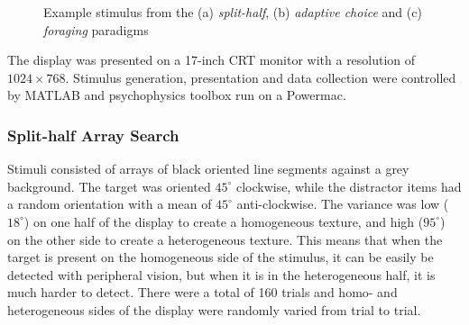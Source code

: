 \documentclass[]{rsos}%
\begin{document}
\begin{figure}
\centering
{}
\caption{Example stimulus from the (a) \textit{split-half}, (b) \textit{adaptive choice} and (c) \textit{foraging} paradigms}
\label{fig:exampleStimuli}
\end{figure}

The display was presented on a 17-inch CRT monitor with a resolution of $1024 \times 
768$. Stimulus generation, presentation and data collection were controlled by MATLAB and psychophysics toolbox \cite{brainard1997} run on a Powermac. 

\subsubsection{Split-half Array Search}

Stimuli consisted of arrays of black oriented line segments against a grey background. The target was oriented $45^{\circ}$ clockwise, while the distractor items had a random orientation with a mean of $45^{\circ}$ anti-clockwise. The variance was low ($18^{\circ}$) on one half of the display to create a homogeneous texture, and high ($95^{\circ}$) on the other side to create a heterogeneous texture. This means that when the target is present on the homogeneous side of the stimulus, it can be easily be detected with peripheral vision, but when it is in the heterogeneous half, it is much harder to detect. There were a total of 160 trials and homo- and heterogeneous sides of the display were randomly varied from trial to trial.
 
\end{document}
